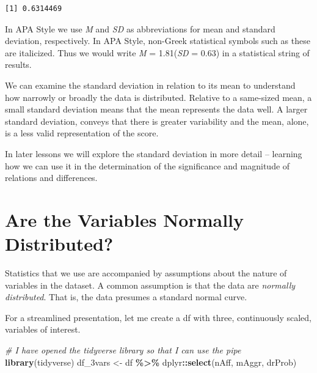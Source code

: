\documentclass[
  11pt,
]{book}
\newenvironment{Shaded}{\begin{snugshade}}{\end{snugshade}}
\newcommand{\CommentTok}[1]{\textcolor[rgb]{0.37,0.37,0.37}{\textit{#1}}}
\newcommand{\FunctionTok}[1]{\textcolor[rgb]{0.27,0.27,0.27}{\textbf{#1}}}
\newcommand{\NormalTok}[1]{#1}
\newcommand{\OtherTok}[1]{\textcolor[rgb]{0.37,0.37,0.37}{#1}}
\newcommand{\SpecialCharTok}[1]{\textcolor[rgb]{0.43,0.43,0.43}{\textbf{#1}}}
\begin{document}
\begin{Shaded}
\end{Shaded}

\begin{verbatim}
[1] 0.6314469
\end{verbatim}

In APA Style we use \emph{M} and \emph{SD} as abbreviations for mean and standard deviation, respectively. In APA Style, non-Greek statistical symbols such as these are italicized. Thus we would write \emph{M} = 1.81(\emph{SD} = 0.63) in a statistical string of results.

We can examine the standard deviation in relation to its mean to understand how narrowly or broadly the data is distributed. Relative to a same-sized mean, a small standard deviation means that the mean represents the data well. A larger standard deviation, conveys that there is greater variability and the mean, alone, is a less valid representation of the score.

In later lessons we will explore the standard deviation in more detail -- learning how we can use it in the determination of the significance and magnitude of relations and differences.

\hypertarget{are-the-variables-normally-distributed}{%
\section{Are the Variables Normally Distributed?}\label{are-the-variables-normally-distributed}}

Statistics that we use are accompanied by assumptions about the nature of variables in the dataset. A common assumption is that the data are \emph{normally distributed}. That is, the data presumes a standard normal curve.

For a streamlined presentation, let me create a df with three, continuously scaled, variables of interest.

\begin{Shaded}
\begin{Highlighting}[]
\CommentTok{\# I have opened the tidyverse library so that I can use the pipe}
\FunctionTok{library}\NormalTok{(tidyverse)}
\NormalTok{df\_3vars }\OtherTok{\textless{}{-}}\NormalTok{ df }\SpecialCharTok{\%\textgreater{}\%}
\NormalTok{    dplyr}\SpecialCharTok{::}\FunctionTok{select}\NormalTok{(nAff, mAggr, drProb)}
\end{Highlighting}
\end{Shaded}
\end{document}
